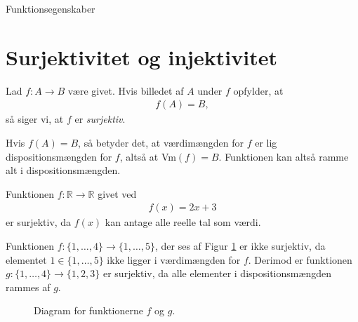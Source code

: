 

\begin{center}
\Huge
	Funktionsegenskaber
\end{center}
\section*{Surjektivitet og injektivitet}

\begin{defn}
Lad $f:A \to B$ være givet. Hvis billedet af $A$ under $f$ opfylder, at 
\begin{align*}
f(A) = B, 
\end{align*}
så siger vi, at $f$ er \textit{surjektiv}. 
\end{defn}
Hvis $f(A) = B$, så betyder det, at værdimængden for $f$ er lig dispositionsmængden for $f$, altså at Vm$(f) = B.$ Funktionen kan altså ramme alt i dispositionsmængden. 
\begin{exa}
Funktionen $f:\mathbb{R} \to \mathbb{R}$ givet ved
\begin{align*}
f(x) = 2x+3
\end{align*}
er surjektiv, da $f(x)$ kan antage alle reelle tal som værdi.
\end{exa}
\begin{exa}
Funktionen $f:\{1,\hdots,4\} \to \{1,\hdots,5\}$, der ses af Figur \ref{fig:ikkesur} er ikke surjektiv, da elementet $1\in \{1,\hdots,5\}$ ikke ligger i værdimængden for $f$. Derimod er funktionen $g: \{1,\hdots,4\} \to \{1,2,3\}$ er surjektiv, da alle elementer i dispositionsmængden rammes af $g$.
\begin{figure}[H]
\centering
{}
\caption{Diagram for funktionerne $f$ og $g$.}
\label{fig:ikkesur}
\end{figure}
\end{exa}

